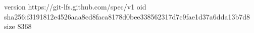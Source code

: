 version https://git-lfs.github.com/spec/v1
oid sha256:f3191812e4526aaa8cd8faca8178d0bee338562317d7c9fae1d37a6dda13b7d8
size 8368
